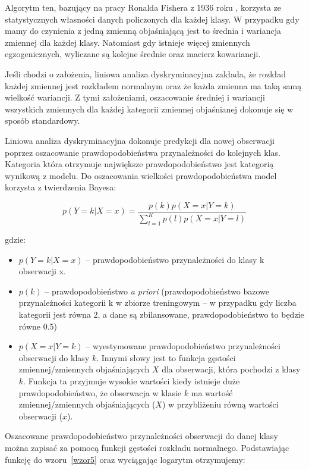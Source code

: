 \documentclass[12pt,a4paper,twoside,openany]{book}
\begin{document}
Algorytm ten, bazujący na pracy Ronalda Fishera z 1936 roku \citep{fisher1936}, korzysta ze statystycznych własności danych policzonych dla każdej klasy. W przypadku gdy mamy do czynienia z jedną zmienną objaśniającą jest to średnia i wariancja zmiennej dla każdej klasy. Natomiast gdy istnieje więcej zmiennych egzogenicznych, wyliczane są kolejne średnie oraz macierz kowariancji. 

Jeśli chodzi o założenia, liniowa analiza dyskryminacyjna zakłada, że rozkład każdej zmiennej jest rozkładem normalnym oraz że każda zmienna ma taką samą wielkość wariancji. Z tymi założeniami, oszacowanie średniej i wariancji wszystkich zmiennych dla każdej kategorii zmiennej objaśnianej dokonuje się w sposób standardowy. 

Liniowa analiza dyskryminacyjna dokonuje predykcji dla nowej obserwacji poprzez oszacowanie prawdopodobieństwa przynależności do kolejnych klas. Kategoria która otrzymuje największe prawdopodobieństwo jest kategorią wynikową z modelu. Do oszacowania wielkości prawdopodobieństwa model korzysta z twierdzenia Bayesa:

\begin{equation} \label{wzor5}
p(Y = k | X = x) = \frac{p(k)p(X = x | Y = k)}{\sum_{l = 1}^{K} p(l)p(X = x | Y = l)} 
\end{equation}

gdzie:
\begin{itemize}
\item $p(Y=k | X=x)$ – prawdopodobieństwo przynależności do klasy k obserwacji x.
\item$ p(k)$ – prawdopodobieństwo \textit{a priori} (prawdopodobieństwo bazowe przynależności kategorii k w zbiorze treningowym – w przypadku gdy liczba kategorii jest równa 2, a dane są zbilansowane, prawdopodobieństwo to będzie równe 0.5)
\item $p(X=x | Y=k)$ – wyestymowane prawdopodobieństwo przynależności obserwacji do klasy $k$. Innymi słowy jest to funkcja gęstości zmiennej/zmiennych objaśniających $X$ dla obserwacji, która pochodzi z klasy $k$. Funkcja ta przyjmuje wysokie wartości kiedy istnieje duże prawdopodobieństwo, że obserwacja w klasie $k$ ma wartość zmiennej/zmiennych objaśniających ($X$) w przybliżeniu równą wartości obserwacji ($x$).
\end{itemize}

Oszacowane prawdopodobieństwo przynależności obserwacji do danej klasy można zapisać za pomocą funkcji gęstości rozkładu normalnego. Podstawiając funkcję do wzoru~\ref{wzor5} oraz wyciągając logarytm otrzymujemy:
\end{document}
